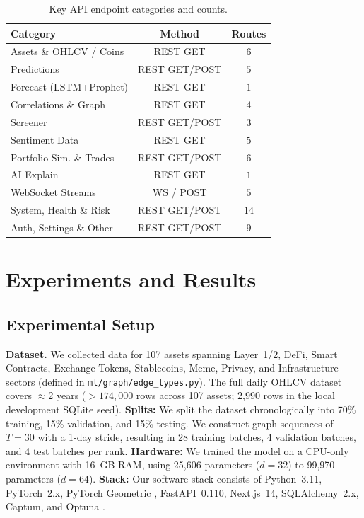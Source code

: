 \documentclass{article}
\begin{document}
\begin{table}[h]
  \centering
  \caption{Key API endpoint categories and counts.}
  \vspace{3pt}
  \label{tab:api}
  \setlength{\tabcolsep}{6pt}
  \begin{tabular}{lcc}
    \toprule
    Category & Method & Routes \\
    \midrule
    Assets \& OHLCV / Coins  & REST GET       & $6$ \\
    Predictions              & REST GET/POST  & $5$ \\
    Forecast (LSTM+Prophet)  & REST GET       & $1$ \\
    Correlations \& Graph    & REST GET       & $4$ \\
    Screener                 & REST GET/POST  & $3$ \\
    Sentiment Data           & REST GET       & $5$ \\
    Portfolio Sim. \& Trades & REST GET/POST  & $6$ \\
    AI Explain               & REST GET       & $1$ \\
    WebSocket Streams        & WS / POST      & $5$ \\
    System, Health \& Risk   & REST GET/POST  & $14$ \\
    Auth, Settings \& Other  & REST GET/POST  & $9$ \\
    \bottomrule
  \end{tabular}
\end{table}

\section{Experiments and Results}

\subsection{Experimental Setup}

\textbf{Dataset.} We collected data for 107 assets spanning Layer~1/2, DeFi, Smart Contracts, Exchange Tokens, Stablecoins, Meme, Privacy, and Infrastructure sectors (defined in \texttt{ml/graph/edge\_types.py}). The full daily OHLCV dataset covers $\approx$2 years ($>174{,}000$ rows across 107 assets; 2,990 rows in the local development SQLite seed). \textbf{Splits:} We split the dataset chronologically into 70\% training, 15\% validation, and 15\% testing. We construct graph sequences of $T=30$ with a 1-day stride, resulting in 28 training batches, 4 validation batches, and 4 test batches per rank. \textbf{Hardware:} We trained the model on a CPU-only environment with 16~GB RAM, using 25,606 parameters ($d=32$) to 99,970 parameters ($d=64$). \textbf{Stack:} Our software stack consists of Python~3.11, PyTorch~2.x, PyTorch Geometric \cite{fey2019pyg}, FastAPI~0.110, Next.js~14, SQLAlchemy~2.x, Captum, and Optuna \cite{akiba2019optuna}.
\end{document}
